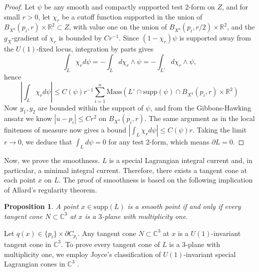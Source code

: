 \documentclass[11pt]{article}
\newtheorem{proposition}{Proposition}
\begin{document}
\begin{proof}
Let $\psi$ be any smooth and compactly supported test 2-form on $Z$, and for small $r>0$, let $\chi_r$ be a cutoff function supported in the union of  $B_{X^4}(p_i, r)\times \mathbb{R}^2\subset Z$, with value one on the union of $B_{X^4}(p_i,r/2)\times \mathbb{R}^2$, and the $g_X$-gradient of $\chi_r$ is bounded by $Cr^{-1}$. Since $(1-\chi_r)\psi$ is supported away from the $U(1)$-fixed locus, integration by parts gives
\[
\int_{L} \chi_rd \psi= - \int_L d\chi_r \wedge \psi= - \int_{L^\circ} d\chi_r \wedge \psi ,
\]
hence
\[
|\int_{L} \chi_rd \psi|\leq C(\psi) r^{-1} \sum_{i=1}^n \text{Mass}(L^\circ\cap  \text{supp}   (\psi)\cap B_{X^4}(p_i,r)\times \mathbb{R}^2) 
\]
Now $y_1,y_2$ are bounded within the support of $\psi$, and from the Gibbons-Hawking ansatz we know $|u-p_i|\leq C r^2$ on $B_{X^4}(p_i,r)$.
The same argument as in the local finiteness of measure now gives a bound $|\int_{L} \chi_rd \psi|\leq C(\psi)r$. Taking the limit $r\to 0$, we deduce that $\int_{L} d \psi=0$ for any test 2-form, which means $\partial L=0$.
\end{proof}


Now, we prove the smoothness. $L$ is a special Lagrangian integral current and, in particular, a minimal integral current. Therefore, there exists a tangent cone at each point $x$ on $L$. The proof of smoothness is based on the following implication of Allard's regularity theorem.


\begin{proposition}\label{smooth-points}
    A point $x \in \text{supp}(L)$ is a smooth point if and only if every tangent cone $N \subset \mathbb{C}^3$ at $x$ is a $3$-plane with multiplicity one.
\end{proposition}

Let $q(x) \in \{p_i\} \times \partial C_{p_i}$. Any tangent cone $N \subset \mathbb{C}^3$ at $x$ is a $U(1)$-invariant tangent cone in $\mathbb{C}^3$. To prove every tangent cone of $L$ is a $3$-plane with multiplicity one, we employ Joyce's classification of $U(1)$-invariant special Lagrangian cones in $\mathbb{C}^3$ \cite{MR2122282}. 
\end{document}
